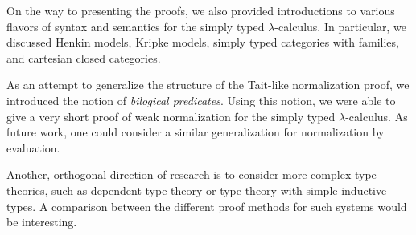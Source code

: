 On the way to presenting the proofs, we also provided introductions to various flavors of syntax and semantics for the simply typed $\lambda$-calculus. In particular, we discussed Henkin models, Kripke models, simply typed categories with families, and cartesian closed categories.

As an attempt to generalize the structure of the Tait-like normalization proof, we introduced the notion of \textit{bilogical predicates}. Using this notion, we were able to give a very short proof of weak normalization for the simply typed $\lambda$-calculus. As future work, one could consider a similar generalization for normalization by evaluation.

Another, orthogonal direction of research is to consider more complex type theories, such as dependent type theory or type theory with simple inductive types. A comparison between the different proof methods for such systems would be interesting.
